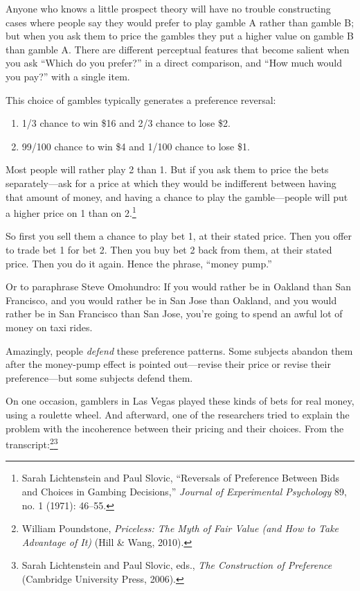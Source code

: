{
 Anyone who knows a little prospect theory will have no trouble
constructing cases where people say they would prefer to play gamble A
rather than gamble B; but when you ask them to price the gambles they
put a higher value on gamble B than gamble A. There are different
perceptual features that become salient when you ask
``Which do you prefer?'' in a direct
comparison, and ``How much would you
pay?'' with a single item.}

{
 This choice of gambles typically generates a preference reversal:}

\begin{enumerate}
\item {
 1/3 chance to win \$16 and 2/3 chance to lose \$2.}

\item {
  99/100 chance to win \$4 and 1/100 chance to lose \$1.}
\end{enumerate}

{
 Most people will rather play 2 than 1. But if you ask them to
price the bets separately---ask for a price at which they would be
indifferent between having that amount of money, and having a chance to
play the gamble---people will put a higher price on 1 than on
2.\footnote{Sarah Lichtenstein and Paul Slovic,
``Reversals of Preference Between Bids and Choices in
Gambing Decisions,'' \textit{Journal of Experimental
Psychology} 89, no. 1 (1971): 46--55.}}

{
 So first you sell them a chance to play bet 1, at their stated
price. Then you offer to trade bet 1 for bet 2. Then you buy bet 2 back
from them, at their stated price. Then you do it again. Hence the
phrase, ``money pump.''}

{
 Or to paraphrase Steve Omohundro: If you would rather be in
Oakland than San Francisco, and you would rather be in San Jose than
Oakland, and you would rather be in San Francisco than San Jose,
you're going to spend an awful lot of money on taxi
rides.}

{
 Amazingly, people \textit{defend} these preference patterns. Some
subjects abandon them after the money-pump effect is pointed
out---revise their price or revise their preference---but some subjects
defend them.}

{
 On one occasion, gamblers in Las Vegas played these kinds of bets
for real money, using a roulette wheel. And afterward, one of the
researchers tried to explain the problem with the incoherence between
their pricing and their choices. From the
transcript:\footnote{William Poundstone, \textit{Priceless: The Myth of Fair Value
(and How to Take Advantage of It)} (Hill \& Wang, 2010).}\supercomma\footnote{Sarah Lichtenstein and Paul Slovic, eds., \textit{The
Construction of Preference} (Cambridge University Press, 2006).}}


